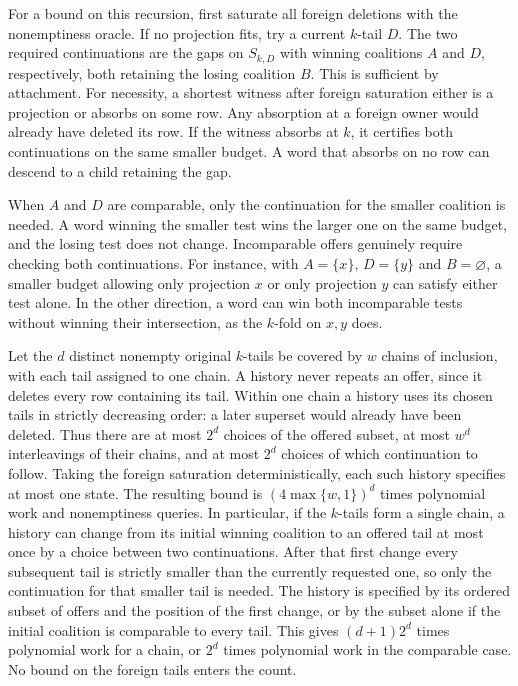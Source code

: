 For a bound on this recursion, first saturate all
foreign deletions with the nonemptiness oracle.
If no projection fits, try a current $k$-tail $D$.
The two required continuations are the gaps on
$S_{k,D}$ with winning coalitions $A$ and $D$,
respectively, both retaining the losing coalition
$B$. This is sufficient by attachment. For
necessity, a shortest witness after foreign
saturation either is a projection or absorbs on
some row. Any absorption at a foreign owner
would already have deleted its row. If the witness
absorbs at $k$, it certifies both continuations on
the same smaller budget. A word that absorbs on
no row can descend to a child retaining the gap.

When $A$ and $D$ are comparable, only the
continuation for the smaller coalition is needed.
A word winning the smaller test wins the larger
one on the same budget, and the losing test
does not change. Incomparable offers genuinely
require checking both continuations. For instance,
with $A=\{x\}$, $D=\{y\}$ and $B=\varnothing$,
a smaller budget allowing only projection $x$ or
only projection $y$ can satisfy either test alone.
In the other direction, a word can win both
incomparable tests without winning their
intersection, as the $k$-fold on $x,y$ does.

Let the $d$ distinct nonempty original $k$-tails be
covered by $w$ chains of inclusion, with each tail
assigned to one chain. A history never repeats an
offer, since it deletes every row containing its
tail. Within one chain a history uses its chosen
tails in strictly decreasing order: a later superset
would already have been deleted. Thus there are at
most $2^d$ choices of the offered subset, at most
$w^d$ interleavings of their chains, and at most
$2^d$ choices of which continuation to follow.
Taking the foreign saturation deterministically,
each such history specifies at most one state.
The resulting bound is $(4\max\{w,1\})^d$ times
polynomial work and nonemptiness queries. In
particular, if the $k$-tails form a single chain,
a history can change from its initial winning
coalition to an offered tail at most once by
a choice between two continuations. After that
first change every subsequent tail is strictly
smaller than the currently requested one, so
only the continuation for that smaller tail
is needed. The history is specified by its
ordered subset of offers and the position of
the first change, or by the subset alone if
the initial coalition is comparable to every
tail. This gives $(d+1)2^d$ times polynomial work
for a chain, or $2^d$ times polynomial work in
the comparable case. No bound on the foreign
tails enters the count.

